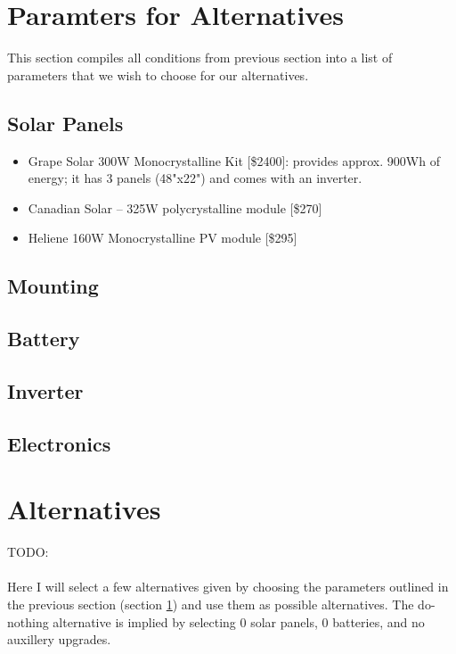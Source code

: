 \documentclass[10pt,letterpaper]{article}
\begin{document}
\section{Paramters for Alternatives}\label{section:parameters}

This section compiles all conditions from previous section into a list of parameters that we wish to choose for our alternatives.\\

\subsection{Solar Panels}

\begin{itemize}
	\item Grape Solar 300W Monocrystalline Kit [\$2400]: provides approx. 900Wh of energy; it has 3 panels (48"x22") and comes with an inverter\cite{hd-solar1}.

	\item Canadian Solar – 325W polycrystalline module [\$270]\cite{raysolar-solar1}

	\item Heliene 160W Monocrystalline PV module [\$295] \cite{raysolar-solar2}
\end{itemize}

\subsection{Mounting}

\subsection{Battery}

\subsection{Inverter}

\subsection{Electronics}

\section{Alternatives}

TODO:\\
\\
Here I will select a few alternatives given by choosing the parameters outlined in the previous section (section \ref{section:parameters}) and use them as possible alternatives. The do-nothing alternative is implied by selecting 0 solar panels, 0 batteries, and no auxillery upgrades.\\
\end{document}
